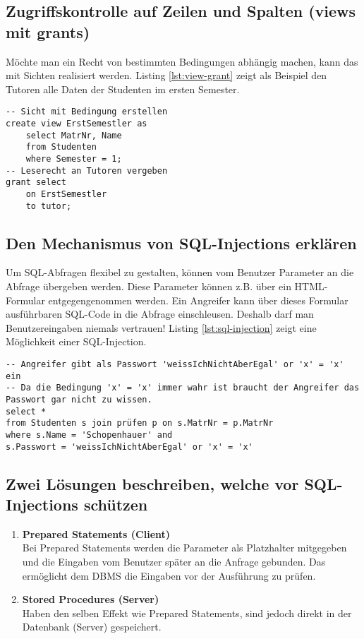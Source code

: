 \subsection{Zugriffskontrolle auf Zeilen und Spalten (views mit grants)}

Möchte man ein Recht von bestimmten Bedingungen abhängig machen, kann das mit Sichten realisiert werden. Listing \ref{lst:view-grant} zeigt als Beispiel den Tutoren alle Daten der Studenten im ersten Semester.

\begin{lstlisting}[caption={Rechte auf Zeilen und Spalten},label=lst:view-grant]
-- Sicht mit Bedingung erstellen
create view ErstSemestler as
	select MatrNr, Name
	from Studenten
	where Semester = 1;
-- Leserecht an Tutoren vergeben
grant select
	on ErstSemestler
	to tutor;
\end{lstlisting}

\subsection{Den Mechanismus von SQL-Injections erklären}

Um SQL-Abfragen flexibel zu gestalten, können vom Benutzer Parameter an die Abfrage übergeben werden. Diese Parameter können z.B. über ein HTML-Formular entgegengenommen werden. Ein Angreifer kann über dieses Formular ausführbaren SQL-Code in die Abfrage einschleusen. Deshalb darf man Benutzereingaben niemals vertrauen! Listing \ref{lst:sql-injection} zeigt eine Möglichkeit einer SQL-Injection.

\begin{lstlisting}[caption={SQL-Injection},label=lst:sql-injection]
-- Angreifer gibt als Passwort 'weissIchNichtAberEgal' or 'x' = 'x' ein
-- Da die Bedingung 'x' = 'x' immer wahr ist braucht der Angreifer das Passwort gar nicht zu wissen.
select *
from Studenten s join prüfen p on s.MatrNr = p.MatrNr
where s.Name = 'Schopenhauer' and
s.Passwort = 'weissIchNichtAberEgal' or 'x' = 'x'
\end{lstlisting}

\subsection{Zwei Lösungen beschreiben, welche vor SQL-Injections schützen}

\begin{enumerate}
	\item \textbf{Prepared Statements (Client)} \\
		  Bei Prepared Statements werden die Parameter als Platzhalter mitgegeben und die Eingaben vom Benutzer später an die Anfrage gebunden. Das ermöglicht dem \ac{DBMS} die Eingaben vor der Ausführung zu prüfen.
	\item \textbf{Stored Procedures (Server)} \\
		  Haben den selben Effekt wie Prepared Statements, sind jedoch direkt in der Datenbank (Server) gespeichert.
\end{enumerate}
